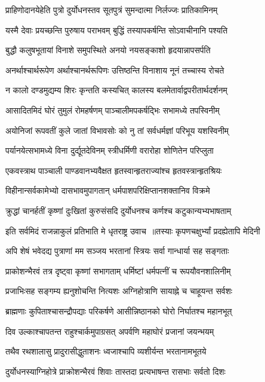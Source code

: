 \twolineshloka
{प्राहिणोदानयेहेति पुत्रो दुर्योधनस्तव}
{सूतपुत्रं सुमन्दात्मा निर्लज्जः प्रातिकामिनम्}


\twolineshloka
{यस्मै देवाः प्रयच्छन्ति पुरुषाय पराभवम्}
{बुद्धिं तस्यापकर्षन्ति सोऽवाचीनानि पश्यति}


\twolineshloka
{बुद्धौ कलुषभूतायां विनाशे समुपस्थिते}
{अनयो नयसङ्काशो हृदयान्नापसर्पति}


\twolineshloka
{अनर्थाश्चार्थरूपेण अर्थाश्चानर्थरूपिणः}
{उत्तिष्ठन्ति विनाशाय नूनं तच्चास्य रोचते}


\twolineshloka
{न कालो दण्डमुद्यम्य शिरः कृन्तति कस्यचित्}
{कालस्य बलमेतार्वाद्वपरीतार्थदर्शनम्}


\twolineshloka
{आसादितमिदं घोरं तुमुलं रोमहर्षणम्}
{पाञ्चालीमपकर्षद्भिः सभामध्ये तपस्विनीम्}


\twolineshloka
{अयोनिजां रूपवतीं कुले जातां विभावसोः}
{को नु तां सर्वधर्मज्ञां परिभूय यशस्विनीम्}


\twolineshloka
{पर्यानयेत्सभामध्ये विना दुर्द्यूतदेविनम्}
{स्त्रीधर्मिणी वरारोहा शोणितेन परिप्लुता}


\twolineshloka
{एकवस्त्राथ पाञ्चाली पाण्डवानभ्यवैक्षत}
{हृतस्वान्हृतराज्यांश्च हृतवस्त्रान्हृतश्रियः}


\twolineshloka
{विहीनान्सर्वकामेभ्यो दासभावमुपागतान्}
{धर्मपाशपरिक्षिप्तानशक्तानिव विक्रमे}


\twolineshloka
{क्रुद्धां चानर्हतीं कृष्णां दुःखितां कुरुसंसदि}
{दुर्योधनश्च कर्णश्च कटुकान्यभ्यभाषताम्}


\twolineshloka
{इति सर्वमिदं राजन्नाकुलं प्रतिभाति मे}
{धृतराष्ट्र उवाच ॥तस्याः कृपणचक्षुर्भ्यां प्रदह्येतापि मेदिनी}


\twolineshloka
{अपि शेषं भवेदद्य पुत्राणां मम सञ्जय}
{भरतानां स्त्रियः सर्वा गान्धार्या सह सङ्गताः}


\twolineshloka
{प्राकोशन्भैरवं तत्र दृष्ट्वा कृष्णां सभागताम्}
{धर्मिष्टां धर्मपत्नीं च रूपयौवनशालिनीम्}


\twolineshloka
{प्रजाभिःसह सङ्गम्य ह्यनुशोचन्ति नित्यशः}
{अग्निहोत्राणि सायाह्ने च चाहूयन्त सर्वशः}


\twolineshloka
{ब्राह्मणाः कुपिताश्चासन्द्रौपद्याः परिकर्षणे}
{आसीन्निष्ठानको घोरो निर्घातश्च महानभूत्}


\twolineshloka
{दिव उल्काश्चापतन्त राहुश्चार्कमुपाग्रसत्}
{अपर्वणि महाघोरं प्रजानां जयन्भयम्}


\twolineshloka
{तथैव रथशालासु प्रादुरासीद्धुताशनः}
{ध्वजाश्चापि व्यशीर्यन्त भरतानामभूतये}


\twolineshloka
{दुर्योधनस्याग्निहोत्रे प्राक्रोशन्भैरवं शिवाः}
{तास्तदा प्रत्यभाषन्त रासभाः सर्वतो दिशः}


